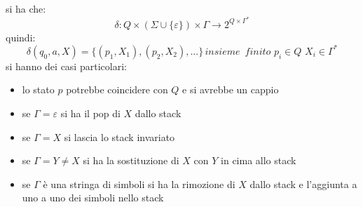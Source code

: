 si ha che:
$$\delta:Q\times(\Sigma\cup\{\varepsilon\})\times \Gamma\to 2^{Q\times \Gamma^*}$$
quindi:
$$\delta(q_0,a,X)=\{(p_1,X_1),(p_2,X_2),...\}\,insieme\,\,\,finito\,\,p_i\in Q\,\,X_i\in \Gamma^*$$
si hanno dei casi particolari:
\begin{itemize}
	\item lo stato $p$ potrebbe coincidere con $Q$ e si avrebbe un cappio
	\item se $\Gamma=\varepsilon$ si ha il pop di $X$ dallo stack
	\item se $\Gamma=X$ si lascia lo stack invariato
	\item se $\Gamma=Y\neq X$ si ha la sostituzione di $X$ con $Y$ in cima allo stack
	\item se $\Gamma$ è una stringa di simboli si ha la rimozione di $X$ dallo stack e l'aggiunta a uno a uno dei simboli nello stack
\end{itemize}

